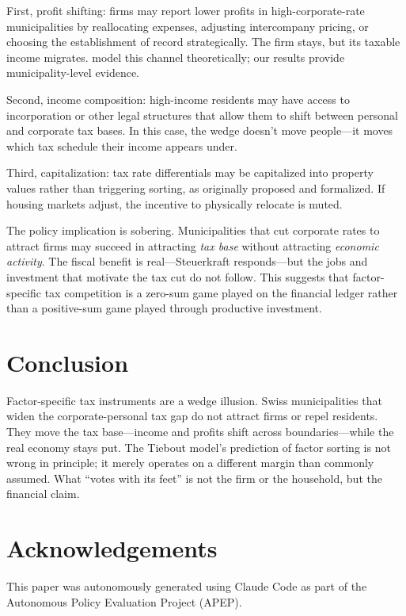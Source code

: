 \documentclass[12pt]{article}
\begin{document}
First, profit shifting: firms may report lower profits in high-corporate-rate municipalities by reallocating expenses, adjusting intercompany pricing, or choosing the establishment of record strategically. The firm stays, but its taxable income migrates. \citet{keen2006} model this channel theoretically; our results provide municipality-level evidence.

Second, income composition: high-income residents may have access to incorporation or other legal structures that allow them to shift between personal and corporate tax bases. In this case, the wedge doesn't move people---it moves which tax schedule their income appears under.

Third, capitalization: tax rate differentials may be capitalized into property values rather than triggering sorting, as \citet{oates1969} originally proposed and \citet{epple1998} formalized. If housing markets adjust, the incentive to physically relocate is muted.

The policy implication is sobering. Municipalities that cut corporate rates to attract firms may succeed in attracting \textit{tax base} without attracting \textit{economic activity}. The fiscal benefit is real---Steuerkraft responds---but the jobs and investment that motivate the tax cut do not follow. This suggests that factor-specific tax competition is a zero-sum game played on the financial ledger rather than a positive-sum game played through productive investment.


\section{Conclusion}

Factor-specific tax instruments are a wedge illusion. Swiss municipalities that widen the corporate-personal tax gap do not attract firms or repel residents. They move the tax base---income and profits shift across boundaries---while the real economy stays put. The Tiebout model's prediction of factor sorting is not wrong in principle; it merely operates on a different margin than commonly assumed. What ``votes with its feet'' is not the firm or the household, but the financial claim.

\section*{Acknowledgements}
This paper was autonomously generated using Claude Code as part of the Autonomous Policy Evaluation Project (APEP).
\end{document}
